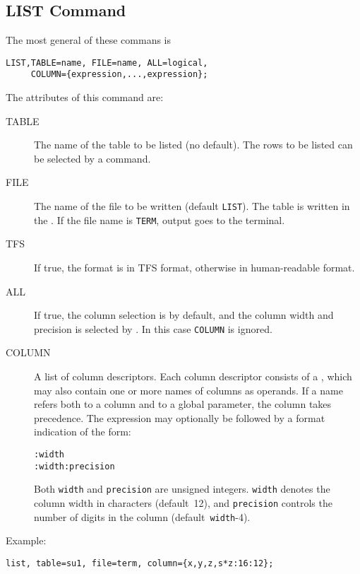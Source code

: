 \subsection{LIST Command}
The most general of these commans is
\begin{verbatim}
LIST,TABLE=name, FILE=name, ALL=logical,
     COLUMN={expression,...,expression};
\end{verbatim}
The attributes of this command are:
\begin{description}
\item[TABLE]
  The name of the table to be listed (no default). 
  The rows to be listed can be selected by a
   command.
\item[FILE]
  The name of the file to be written (default \texttt{LIST}).
  The table is written in the .
  If the file name is \texttt{TERM}, output goes to the terminal.
\item[TFS]
  If true, the format is in TFS format, otherwise in human-readable
  format. 
\item[ALL]
  If true, the column selection is by default, and the column width
  and precision is selected by \opal .
  In this case \texttt{COLUMN} is ignored.
\item[COLUMN]
  A list of column descriptors.
  Each column descriptor consists of a ,
  which may also contain one or more names of columns as operands.
  If a name refers both to a column and to a global parameter,
  the column takes precedence.
  The expression may optionally be followed by a format indication of
  the form:
\begin{verbatim}
:width
:width:precision
\end{verbatim}
  Both \texttt{width} and \texttt{precision} are unsigned integers.
  \texttt{width} denotes the column width in characters (default~12),
  and \texttt{precision} controls the number of digits in the column
  (default~\texttt{width}-4).
\end{description}
Example:
\begin{verbatim}
list, table=su1, file=term, column={x,y,z,s*z:16:12};
\end{verbatim}

